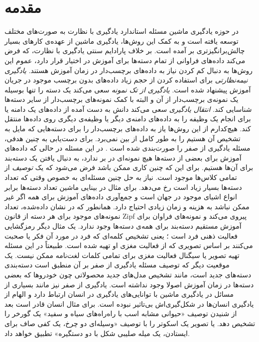\section{مقدمه}\label{intro}

 در حوزه یادگیری ماشین مسئله استاندارد یادگیری با نظارت به صورت‌های مختلف توسعه یافته است و به کمک این روش‌ها، یادگیری ماشین از عهده‌ی کارهای بسیار چالش‌برانگیزتری بر آمده است. بر خلاف پارادایم سنتی یادگیری با نظارت، که فرض می‌کند داده‌های فراوانی از تمام دسته‌ها برای آموزش در اختیار قرار دارد، عموم این روش‌ها به دنبال کم کردن نیاز به داده‌های برچسب‌دار در زمان آموزش هستند. 
\emph{ یادگیری نیمه‌نظارتی}  \cite{chapel06}
برای استفاده کردن از حجم زیاد داده‌های بدون برچسب موجود در جریان آموزش پیشنهاد شده است. 
\emph{یادگیری از تک نمونه}  \cite{miller12}
سعی می‌کند یک دسته را تنها بوسیله یک نمونه‌ی برچسب‌دار از آن و البته با کمک نمونه‌های برچسب‌دار از سایر دسته‌ها شناسایی کند. 
\emph{ انتقال یادگیری}  \cite{pan10survey}
سعی می‌کند دانش به دست آمده از داده‌های یک دامنه یا برای انجام یک وظیفه را به داده‌های دامنه‌ی دیگر یا وظیفه‌ی دیگری روی داده‌ها منتقل کند. 
هیچ‌کدارم از این روش‌ها یاز به داده‌های برچسب‌دار را برای دسته‌هایی که مایل به تشخیص آن هستیم را به طور کامل از بین نمی‌برد. برای دست‌یابی به چنین هدفی، 
مسئله یادگیری از صفر را صورت‌بندی شده است \cite{bengio08}. در این مسئله در حالی که داده‌های آموزش برای بعضی از دسته‌ها هیچ نمونه‌ای در بر ندارد، به دنبال یافتن یک دسته‌بند برای آن‌ها هستیم. برای این که چنین کاری ممکن باشد فرض می‌شود که یک \emph{ توصیف} از تمامی کلاس‌ها موجود است. نیاز به حل  چنین مسئله‌ای به خصوص وقتی که تعداد دسته‌ها بسیار زیاد است رخ می‌دهد. برای مثال در بینایی ماشین تعداد دسته‌ها برابر انواع اشیای موجود در جهان است و جمع‌آوری داده‌های آموزش برای همه اگر غیر ممکن نباشد به هزینه و زمان زیادی احتیاج دارد. همانطور که در 
\cite{sala11}
نشان داده‌شده، تعداد نمونه‌های موجود برای هر دسته از قانون Zipf پیروی می‌کند و نمونه‌های فراوان برای آموزش مستقیم دسته‌بند برای همه‌ی دسته‌ها وجود ندارد. 
 یک مثال دیگر رمزگشایی فعالیت ذهنی فرد است 
\cite{hinton09}؛
یعنی تشخیص کلمه‌ای که فرد در مورد آن فکر یا صحبت می‌کنند بر اساس تصویری که از فعالیت مغزی او تهیه شده است. طبیعتاً در این مسئله تهیه تصویر یا سیگنال فعالیت مغزی برای تمامی کلمات لغت‌نامه ممکن نیست. یک موقعیت دیگر که توصیف مسئله یادگیری از صفر بر آن منطبق است دسته‌بندی دسته‌های جدید است، مانند تشخیص مدل‌های جدید محصولاتی چون خودروها که بعضی دسته‌ها در زمان آموزش اصولا وجود نداشته است. یادگیری از صفر نیز مانند بسیاری از مسائل در یادگیری ماشین با توانایی‌های یادگیری در انسان ارتباط دارد و الهام از یادگیری انسان‌ها در شکل‌گیری‌اش بی‌تاثیر نبوده است. برای مثال انسان قادر است بعد از شنیدن توصیف «حیوانی مشابه اسب با راه‌راه‌های سیاه و سفید» یک گورخر را تشخیص دهد. یا تصویر یک اسکوتر را با توصیف «وسیله‌ای دو چرخ، یک کفی صاف برای ایستادن، یک میله صلیبی شکل با دو دستگیره» تطبیق خواهد داد. 


